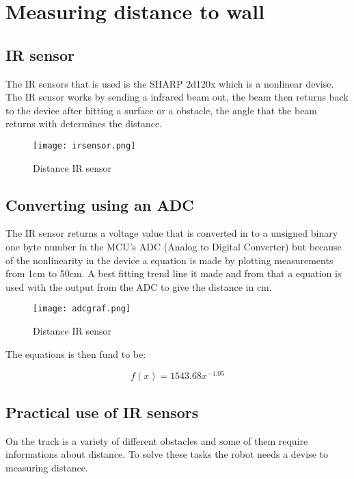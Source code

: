\chapter{Measuring distance to wall}
\label{chap:wall_dist}

\section{IR sensor}
The IR sensors that is used is the SHARP 2d120x which is a nonlinear devise. The IR sensor works by sending a infrared beam out, the beam then returns  back to the device after hitting a surface or a obstacle, the angle that the beam returns with determines the distance. 
  \begin{figure}[!h!]
	\centering
	\texttt{[image: irsensor.png]}
	\caption{Distance IR sensor}
	\label{fig:3}
\end{figure}

\section{Converting using an ADC}
The IR sensor returns a voltage value that is converted in to a unsigned binary one byte number in the MCU's ADC (Analog to Digital Converter) but because of the nonlinearity in the device a equation is made by plotting measurements from 1cm to 50cm. A best fitting trend line it made and from that a equation is used with the output from the ADC to give the distance in cm.
  \begin{figure}[!h]
	\centering
	\texttt{[image: adcgraf.png]}
	\caption{Distance IR sensor}
	\label{fig:3}
\end{figure}

The equations is then fund to be:

\begin{equation}
f(x) = 1543.68
  x^{-1.05}
\end{equation}



\section{Practical use of IR sensors }
On the track is a variety of different obstacles and some of them require informations about distance. To solve these tasks the robot needs a devise to measuring distance. 


